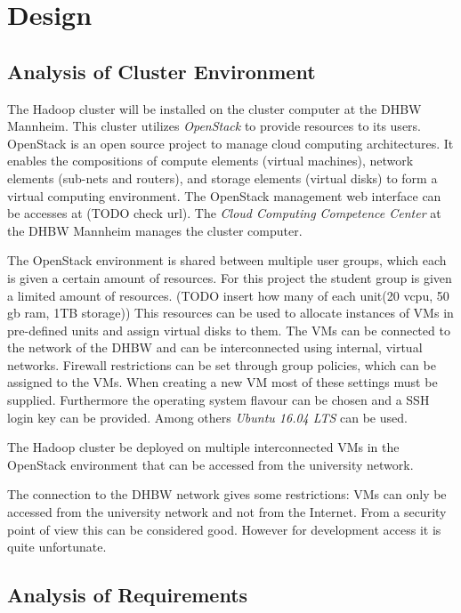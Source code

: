 \chapter{Design}
\label{chap:design}

\section{Analysis of Cluster Environment}

The Hadoop cluster will be installed on the cluster computer at the \ac{DHBW} Mannheim.
This cluster utilizes \emph{OpenStack}  to provide resources to its users. 
OpenStack is an open source project to manage cloud computing architectures.
It enables the compositions of compute elements (virtual machines), network elements (sub-nets and routers), 
and storage elements (virtual disks) to form a virtual computing environment.
The OpenStack management web interface can be accesses at (TODO check url). 
The \emph{Cloud Computing Competence Center} at the \ac{DHBW} Mannheim  manages the cluster computer.

The OpenStack environment is shared between multiple user groups, 
which each is given a certain amount of resources. 
For this project the student group is given a limited amount of resources.
(TODO insert how many of each unit(20 vcpu, 50 gb ram, 1TB storage))
This resources can be used to allocate instances of \acp{VM} in pre-defined units and assign virtual disks to them.
The \acp{VM} can be connected to the network of the \ac{DHBW} and can be interconnected using internal, virtual networks.
Firewall restrictions can be set through group policies, which can be assigned to the \acp{VM}. 
When creating a new \ac{VM} most of these settings must be supplied. 
Furthermore the operating system flavour can be chosen and a \ac{SSH} login key can be provided.
Among others \emph{Ubuntu 16.04 LTS} can be used.

The Hadoop cluster be deployed on multiple interconnected \acp{VM} in the OpenStack environment that can be accessed from the university network.

The connection to the \ac{DHBW} network gives some restrictions: \acp{VM} can only be accessed from the university network and not from the Internet.
From a security point of view this can be considered good. However for development access it is quite unfortunate. 


\section{Analysis of Requirements}

